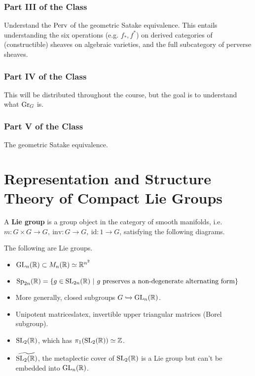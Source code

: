 \subsubsection{Part III of the Class} Understand the $\mathrm{Perv}$ of the geometric
Satake equivalence. This entails understanding the six operations (e.g. $f_*,
f^*$) on derived categories of (constructible) sheaves on algebraic varieties,
and the full subcategory of perverse sheaves.

\subsubsection{Part IV of the Class} This will be distributed throughout the
course, but the goal is to understand what $\mathrm{Gr}_{G}$ is.

\subsubsection{Part V of the Class} The geometric Satake equivalence.

\section{Representation and Structure Theory of Compact Lie Groups}

\begin{defn}
A \textbf{Lie group} is a group object in the category of smooth manifolds, i.e.
$m: G \times G \rightarrow G, \ \mathrm{inv}: G \rightarrow G,
\ \mathrm{id}: {1} \rightarrow G$, satisfying the following diagrams.

\end{defn}

\begin{exmpl}
The following are Lie groups.

\begin{itemize}
\item $\mathrm{GL}_{n}({\mathbb{R}}) \subset M_n(\mathbb{R}) \simeq \mathbb{R}^{n^2}$
\item $\mathrm{Sp}_{2n}({\mathbb{R}}) = \{ g \in \mathrm{SL}_{2n}({\mathbb{R}}) \ | \
  g \ \textrm{preserves a non-degenerate alternating form} \}$
\item More generally, closed subgroups $G \xhookrightarrow{} \mathrm{GL}_{n}({\mathbb{R}})$.
\item Unipotent matriceslatex, invertible upper triangular matrices (Borel subgroup).
\item $\mathrm{SL}_{2}({\mathbb{R}})$, which has $\pi_1(\mathrm{SL}_{2}({\mathbb{R}})) \simeq \mathbb{Z}$.
\item $\widetilde{\mathrm{SL}_{2}({\mathbb{R}})}$, the metaplectic cover of $\mathrm{SL}_{2}({\mathbb{R}})$ is a
Lie group but can't be embedded into $\mathrm{GL}_{n}({\mathbb{R}})$.
\end{itemize}
\end{exmpl}

